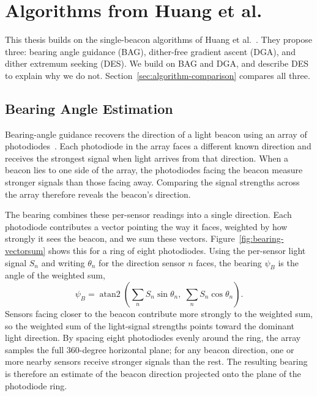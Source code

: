 \section{Algorithms from Huang et al.}
\label{sec:algorithms}

This thesis builds on the single-beacon algorithms of Huang et al.~\cite{huang2026lta}. They propose three: bearing angle guidance (BAG), dither-free gradient ascent (DGA), and dither extremum seeking (DES). We build on BAG and DGA, and describe DES to explain why we do not. Section~\ref{sec:algorithm-comparison} compares all three.

\subsection{Bearing Angle Estimation}
\label{sec:bearing}

Bearing-angle guidance recovers the direction of a light beacon using an array of photodiodes~\cite{huang2026lta}. Each photodiode in the array faces a different known direction and receives the strongest signal when light arrives from that direction. When a beacon lies to one side of the array, the photodiodes facing the beacon measure stronger signals than those facing away. Comparing the signal strengths across the array therefore reveals the beacon's direction.


The bearing combines these per-sensor readings into a single direction. Each photodiode contributes a vector pointing the way it faces, weighted by how strongly it sees the beacon, and we sum these vectors. Figure~\ref{fig:bearing-vectorsum} shows this for a ring of eight photodiodes. Using the per-sensor light signal $S_n$ and writing $\theta_n$ for the direction sensor $n$ faces, the bearing $\psi_B$ is the angle of the weighted sum,
\begin{equation}
\psi_B = \operatorname{atan2}\!\left( \sum_{n} S_n \sin\theta_n,\; \sum_{n} S_n \cos\theta_n \right).
\label{eq:bearing}
\end{equation}
Sensors facing closer to the beacon contribute more strongly to the weighted sum, so the weighted sum of the light-signal strengths points toward the dominant light direction. By spacing eight photodiodes evenly around the ring, the array samples the full 360-degree horizontal plane; for any beacon direction, one or more nearby sensors receive stronger signals than the rest. The resulting bearing is therefore an estimate of the beacon direction projected onto the plane of the photodiode ring.


